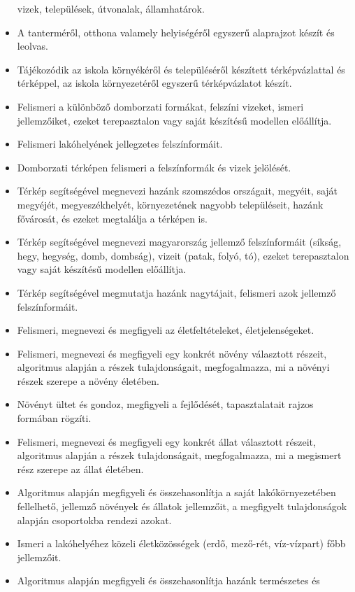 \begin{itemize}
  vizek, települések, útvonalak, államhatárok.
\item
  A tanterméről, otthona valamely helyiségéről egyszerű alaprajzot
  készít és leolvas.
\item
  Tájékozódik az iskola környékéről és településéről készített
  térképvázlattal és térképpel, az iskola környezetéről egyszerű
  térképvázlatot készít.
\item
  Felismeri a különböző domborzati formákat, felszíni vizeket, ismeri
  jellemzőiket, ezeket terepasztalon vagy saját készítésű modellen
  előállítja.
\item
  Felismeri lakóhelyének jellegzetes felszínformáit.
\item
  Domborzati térképen felismeri a felszínformák és vizek jelölését.
\item
  Térkép segítségével megnevezi hazánk szomszédos országait, megyéit,
  saját megyéjét, megyeszékhelyét, környezetének nagyobb településeit,
  hazánk fővárosát, és ezeket megtalálja a térképen is.
\item
  Térkép segítségével megnevezi magyarország jellemző felszínformáit
  (síkság, hegy, hegység, domb, dombság), vizeit (patak, folyó, tó),
  ezeket terepasztalon vagy saját készítésű modellen előállítja.
\item
  Térkép segítségével megmutatja hazánk nagytájait, felismeri azok
  jellemző felszínformáit.
\item
  Felismeri, megnevezi és megfigyeli az életfeltételeket,
  életjelenségeket.
\item
  Felismeri, megnevezi és megfigyeli egy konkrét növény választott
  részeit, algoritmus alapján a részek tulajdonságait, megfogalmazza, mi
  a növényi részek szerepe a növény életében.
\item
  Növényt ültet és gondoz, megfigyeli a fejlődését, tapasztalatait
  rajzos formában rögzíti.
\item
  Felismeri, megnevezi és megfigyeli egy konkrét állat választott
  részeit, algoritmus alapján a részek tulajdonságait, megfogalmazza, mi
  a megismert rész szerepe az állat életében.
\item
  Algoritmus alapján megfigyeli és összehasonlítja a saját
  lakókörnyezetében fellelhető, jellemző növények és állatok jellemzőit,
  a megfigyelt tulajdonságok alapján csoportokba rendezi azokat.
\item
  Ismeri a lakóhelyéhez közeli életközösségek (erdő, mező-rét,
  víz-vízpart) főbb jellemzőit.
\item
  Algoritmus alapján megfigyeli és összehasonlítja hazánk természetes és

\end{itemize}
